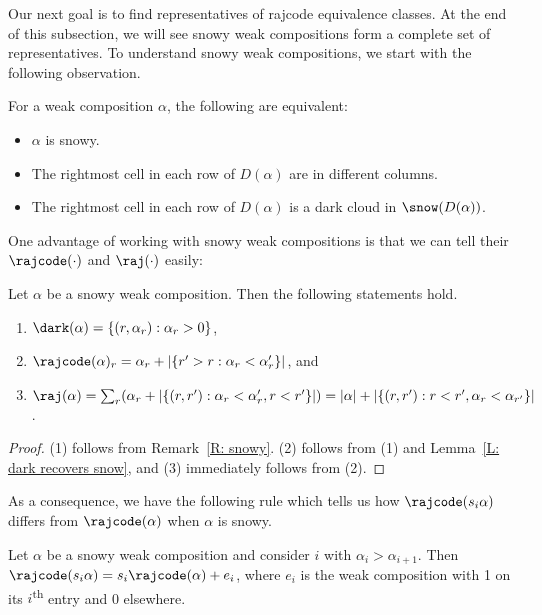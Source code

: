Our next goal is to find representatives
of rajcode equivalence classes. 
At the end of this subsection, 
we will see snowy weak compositions form
a complete set of representatives. 
To understand snowy weak compositions, 
we start with the following observation. 

\begin{rem}
\label{R: snowy}
For a weak composition $\alpha$,
the following are equivalent:
\begin{itemize}
\item $\alpha$ is snowy.
\item The rightmost cell in each row of $D(\alpha)$
are in different columns. 
\item The rightmost cell in each row of $D(\alpha)$
is a dark cloud in $\snow(D(\alpha))$. 
\end{itemize}
\end{rem}

One advantage of working with snowy weak compositions
is that 
we can tell their 
$\rajcode(\cdot)$ and $\raj(\cdot)$ easily:
\begin{lemma}
\label{L: dark, rajcode and raj of snowy weak composition}
Let $\alpha$ be a snowy weak composition.
Then the following statements hold.
\begin{enumerate}
\item $\dark(\alpha) = \{(r,\alpha_r): \alpha_r > 0\}$,\label{snowy.weak.1}
\item $\rajcode(\alpha)_r = \alpha_r + |\{r' > r: \alpha_r < \alpha_r'\}|$, and \label{snowy.weak.2}
\item $\raj(\alpha) = \sum_r (\alpha_r + |\{(r, r'): \alpha_r < \alpha_r', r < r'\}|) = |\alpha| + |\{(r, r'): r < r', \alpha_r < \alpha_{r'}\}|$.\label{snowy.weak.3}
\end{enumerate}
\end{lemma}
\begin{proof}
(1) follows from Remark~\ref{R: snowy}.
(2) follows from (1) and Lemma~\ref{L: dark recovers snow}, and 
(3) immediately follows from (2). 
\end{proof}

As a consequence, we have the following rule which tells us 
how $\rajcode(s_i\alpha)$ differs from 
$\rajcode(\alpha)$ when $\alpha$ is snowy. 

\begin{cor}
\label{C: snowy changes}
Let $\alpha$ be a snowy weak composition and consider $i$ with $\alpha_i > \alpha_{i+1}$.
Then $\rajcode(s_i\alpha) = s_i\rajcode(\alpha) + e_i$,
where $e_i$ is the weak composition with
1 on its $i$\textsuperscript{th} entry and 0 elsewhere.
\end{cor}

